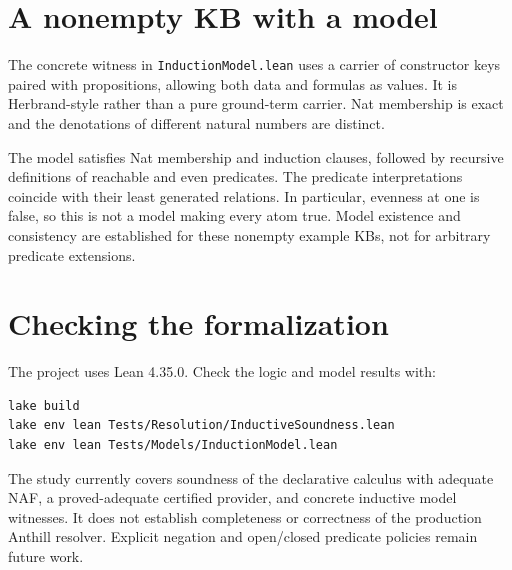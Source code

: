 \documentclass[11pt]{article}
\begin{document}
\section{A nonempty KB with a model}
The concrete witness in \texttt{InductionModel.lean} uses a carrier of constructor
keys paired with propositions, allowing both data and formulas as values.
It is Herbrand-style rather than a pure ground-term carrier. Nat membership is
exact and the denotations of different natural numbers are distinct.

The model satisfies Nat membership and induction clauses, followed by recursive
definitions of reachable and even predicates. The predicate interpretations
coincide with their least generated relations. In particular, evenness at one
is false, so this is not a model making every atom true. Model existence and
consistency are established for these nonempty example KBs, not for arbitrary
predicate extensions.

\section{Checking the formalization}
The project uses Lean 4.35.0. Check the logic and model results with:
\begin{verbatim}
lake build
lake env lean Tests/Resolution/InductiveSoundness.lean
lake env lean Tests/Models/InductionModel.lean
\end{verbatim}
The study currently covers soundness of the declarative calculus with adequate
NAF, a proved-adequate certified provider, and concrete inductive model witnesses.
It does not establish completeness or correctness of the production Anthill
resolver. Explicit negation and open/closed predicate policies remain future work.
\end{document}
